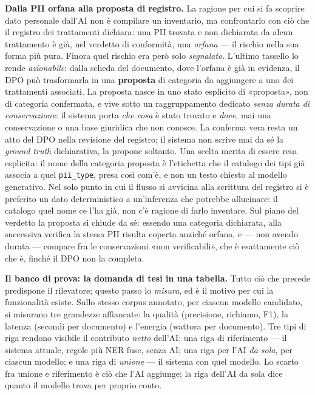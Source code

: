\textbf{Dalla PII orfana alla proposta di registro.} La ragione per cui si fa scoprire dato personale dall'AI non è compilare un inventario, ma confrontarlo con ciò che il registro dei trattamenti dichiara: una PII trovata e non dichiarata da alcun trattamento è già, nel verdetto di conformità, una \emph{orfana} --- il rischio nella sua forma più pura. Finora quel rischio era però solo \emph{segnalato}. L'ultimo tassello lo rende \emph{azionabile}: dalla scheda del documento, dove l'orfana è già in evidenza, il DPO può trasformarla in una \textbf{proposta} di categoria da aggiungere a uno dei trattamenti associati. La proposta nasce in uno stato esplicito di «proposta», non di categoria confermata, e vive sotto un raggruppamento dedicato \emph{senza durata di conservazione}: il sistema porta \emph{che cosa} è stato trovato e \emph{dove}, mai una conservazione o una base giuridica che non conosce. La conferma vera resta un atto del DPO nella revisione del registro; il sistema non scrive mai da sé la \emph{ground truth} dichiarativa, la propone soltanto. Una scelta merita di essere resa esplicita: il nome della categoria proposta è l'etichetta che il catalogo dei tipi già associa a quel \texttt{pii\_type}, presa così com'è, e non un testo chiesto al modello generativo. Nel solo punto in cui il flusso si avvicina alla scrittura del registro si è preferito un dato deterministico a un'inferenza che potrebbe allucinare: il catalogo quel nome ce l'ha già, non c'è ragione di farlo inventare. Sul piano del verdetto la proposta si chiude da sé: essendo una categoria dichiarata, alla successiva verifica la stessa PII risulta coperta anziché orfana, e --- non avendo durata --- compare fra le conservazioni «non verificabili», che è esattamente ciò che è, finché il DPO non la completa. \medskip

\textbf{Il banco di prova: la domanda di tesi in una tabella.} Tutto ciò che precede predispone il rilevatore; questo passo lo \emph{misura}, ed è il motivo per cui la funzionalità esiste. Sullo stesso corpus annotato, per ciascun modello candidato, si misurano tre grandezze affiancate: la qualità (precisione, richiamo, F1), la latenza (secondi per documento) e l'energia (wattora per documento). Tre tipi di riga rendono visibile il contributo \emph{netto} dell'AI: una riga di riferimento --- il sistema attuale, regole più NER fuse, senza AI; una riga per l'AI \emph{da sola}, per ciascun modello; e una riga di \emph{unione} --- il sistema con quel modello. Lo scarto fra unione e riferimento è ciò che l'AI aggiunge; la riga dell'AI da sola dice quanto il modello trova per proprio conto. \medskip

